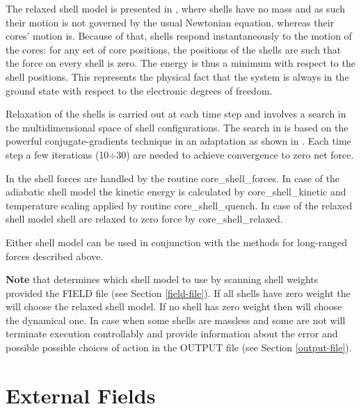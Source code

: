 The relaxed shell model is presented in \cite{lindan-93a}, where
shells have no mass and as such their motion is not governed
by the usual Newtonian equation, whereas their cores' motion is.
Because of that, shells respond instantaneously to the motion
of the cores: for any set of core positions, the positions of
the shells are such that the force on every shell is zero.  The
energy is thus a minimum with respect to the shell positions.
This represents the physical fact that the system is always in the
ground state with respect to the electronic degrees of freedom.

Relaxation of the shells is carried out at each time step and
involves a search in the multidimensional space of shell
configurations.  The search in \D is based on the powerful
conjugate-gradients technique \cite{shewchuk-94a} in an adaptation
as shown in \cite{lindan-93a}.  Each time step a few iterations
(10$\div$30) are needed to achieve convergence to zero net force.

In \D the shell forces are handled by the routine
{\sc core\_shell\_forces}.  In case of the adiabatic shell model
the kinetic energy is calculated by {\sc core\_shell\_kinetic} and
temperature scaling applied by routine {\sc core\_shell\_quench}.
In case of the relaxed shell model shell are relaxed to zero force
by {\sc core\_shell\_relaxed}.

Either shell model can be used in
conjunction with the methods for long-ranged forces described above.

{\bf Note} that \D determines which shell model to use by scanning
shell weights provided the FIELD file (see Section \ref{field-file}).
If all shells have zero weight the \D will choose the relaxed shell
model.  If no shell has zero weight then \D will choose the dynamical
one.  In case when some shells are massless and some are not \D will
terminate execution controllably and provide information about the
error and possible possible choices of action in the OUTPUT file
(see Section \ref{output-file}).

\section{External Fields}
\label{external-field}

